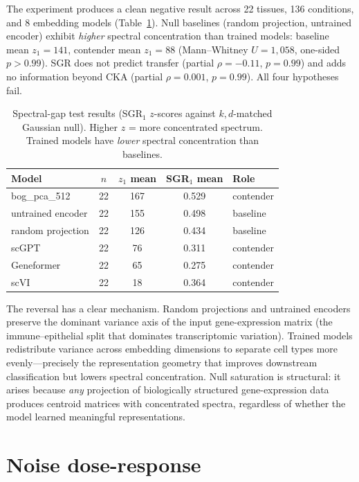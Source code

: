 \documentclass[11pt]{article}
\begin{document}
The experiment produces a clean negative result across 22 tissues,
136 conditions, and 8 embedding models (Table~\ref{tab:sgr}). Null
baselines (random projection, untrained encoder) exhibit \emph{higher}
spectral concentration than trained models: baseline mean $z_1 = 141$,
contender mean $z_1 = 88$ (Mann--Whitney $U = 1{,}058$, one-sided
$p > 0.99$). SGR does not predict transfer (partial $\rho = -0.11$,
$p = 0.99$) and adds no information beyond CKA (partial
$\rho = 0.001$, $p = 0.99$). All four hypotheses fail.

\medskip
\begin{table}[h!]
\centering
\caption{Spectral-gap test results (SGR$_1$ $z$-scores against
$k,d$-matched Gaussian null). Higher $z$ = more concentrated spectrum.
Trained models have \emph{lower} spectral concentration than
baselines.}
\label{tab:sgr}
\small
\begin{tabular}{@{}lcccl@{}}
\toprule
Model & $n$ & $z_1$ mean & SGR$_1$ mean & Role \\
\midrule
bog\_pca\_512           & 22 & 167 & 0.529 & contender \\
untrained encoder       & 22 & 155 & 0.498 & baseline \\
random projection       & 22 & 126 & 0.434 & baseline \\
scGPT                   & 22 & 76  & 0.311 & contender \\
Geneformer              & 22 & 65  & 0.275 & contender \\
scVI                    & 22 & 18  & 0.364 & contender \\
\bottomrule
\end{tabular}
\end{table}

The reversal has a clear mechanism. Random projections and untrained
encoders preserve the dominant variance axis of the input gene-expression
matrix (the immune--epithelial split that dominates transcriptomic
variation). Trained models redistribute variance across embedding
dimensions to separate cell types more evenly---precisely the
representation geometry that improves downstream classification but
lowers spectral concentration. Null saturation is structural: it
arises because \emph{any} projection of biologically structured
gene-expression data produces centroid matrices with concentrated
spectra, regardless of whether the model learned meaningful
representations.


\section{Noise dose-response}
\label{app:noise}
\end{document}
